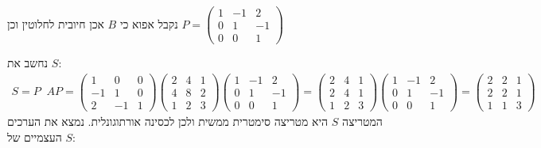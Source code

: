 \documentclass{article}
\DeclareMathOperator{\tra}{^t}
\begin{document}
נקבל אפוא כי $B$ אכן חיובית לחלוטין וכן $P=\begin{pmatrix}
        1 & -1 & 2  \\
        0 & 1  & -1 \\
        0 & 0  & 1
    \end{pmatrix}$

\pagebreak

נחשב את $S$:
\begin{align*}
    S=P\tra A P = \begin{pmatrix}
                      1  & 0  & 0 \\
                      -1 & 1  & 0 \\
                      2  & -1 & 1
                  \end{pmatrix} \begin{pmatrix}
                                    2 & 4 & 1 \\
                                    4 & 8 & 2 \\
                                    1 & 2 & 3
                                \end{pmatrix} \begin{pmatrix}
                                                  1 & -1 & 2  \\
                                                  0 & 1  & -1 \\
                                                  0 & 0  & 1
                                              \end{pmatrix} =
    \begin{pmatrix}
        2 & 4 & 1 \\
        2 & 4 & 1 \\
        1 & 2 & 3
    \end{pmatrix} \begin{pmatrix}
                      1 & -1 & 2  \\
                      0 & 1  & -1 \\
                      0 & 0  & 1
                  \end{pmatrix} = \begin{pmatrix}
                                      2 & 2 & 1 \\
                                      2 & 2 & 1 \\
                                      1 & 1 & 3
                                  \end{pmatrix}
\end{align*}
המטריצה $S$ היא מטריצה סימטרית ממשית ולכן לכסינה אורתוגונלית. נמצא את הערכים העצמיים של $S$:
\end{document}
